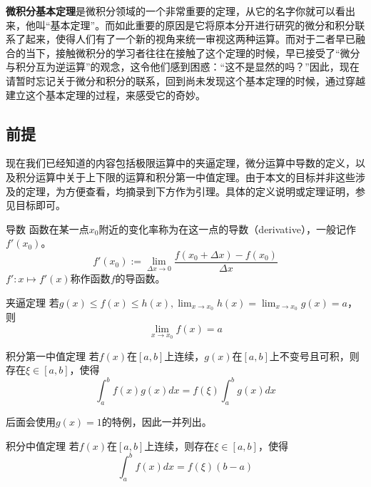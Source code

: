 
\begin{issues}
\issueTODO
\issueMissDepend
\issueNeedCite
\end{issues}


\textbf{微积分基本定理}是微积分领域的一个非常重要的定理，从它的名字你就可以看出来，他叫“基本定理”。而如此重要的原因是它将原本分开进行研究的微分和积分联系了起来，使得人们有了一个新的视角来统一审视这两种运算。而对于二者早已融合的当下，接触微积分的学习者往往在接触了这个定理的时候，早已接受了“微分与积分互为逆运算”的观念，这令他们感到困惑：“这不是显然的吗？”因此，现在请暂时忘记关于微分和积分的联系，回到尚未发现这个基本定理的时候，通过穿越建立这个基本定理的过程，来感受它的奇妙。

\subsection{前提}

现在我们已经知道的内容包括极限运算中的夹逼定理，微分运算中导数的定义，以及积分运算中关于上下限的运算和积分第一中值定理。由于本文的目标并非这些涉及的定理，为方便查看，均摘录到下方作为引理。具体的定义说明或定理证明，参见目标即可。

\begin{definition}{导数}
函数在某一点$x_0$附近的变化率称为在这一点的导数（derivative），一般记作$f'(x_0)$。
$$f'(x_0):=\lim_{\Delta x\to0}{\frac{f(x_0+\Delta x)-f(x_0)}{\Delta x}}$$
$f':x\mapsto f'(x)$称作函数$f$的导函数。
\end{definition}

\begin{lemma}{夹逼定理}
若$g(x)\leq f(x)\leq h(x),\lim _{x\to x_0}h(x)=\lim _{x\to x_0}g(x)=a$，则
$$\lim _{x\to x_0}f(x)=a$$
\end{lemma}

\begin{lemma}{积分第一中值定理}
若$f(x)$在$[a,b]$上连续，$g(x)$在$[a,b]$上不变号且可积，则存在$\xi\in[a,b]$，使得
$$\int_{a}^{b} f(x)g(x)dx=f(\xi)\int_{a}^{b} g(x)dx$$
\end{lemma}

后面会使用$g(x)=1$的特例，因此一并列出。

\begin{lemma}{积分中值定理}
若$f(x)$在$[a,b]$上连续，则存在$\xi\in[a,b]$，使得
$$\int_{a}^{b} f(x)dx=f(\xi)(b-a)$$
\end{lemma}
